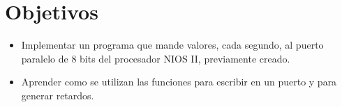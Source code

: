 \section{Objetivos \label{sec:obj}}


\begin{itemize} 
	\item Implementar un programa que mande valores, cada segundo, al puerto paralelo de 8 bits del procesador NIOS II, previamente creado.
	\item Aprender como se utilizan las funciones para escribir en un puerto y para generar retardos.	
\end{itemize}